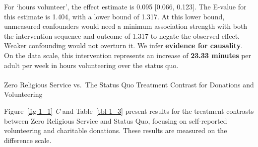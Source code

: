 \documentclass[
  single column]{article}
\makeatletter
\let\oldparagraph\paragraph
\renewcommand{\paragraph}{
    \@ifstar
      \xxxParagraphStar
      \xxxParagraphNoStar
  }
\newcommand{\xxxParagraphStar}[1]{\oldparagraph*{#1}\mbox{}}
\newcommand{\xxxParagraphNoStar}[1]{\oldparagraph{#1}\mbox{}}
\makeatother
\begin{document}
For `hours volunteer', the effect estimate is 0.095 {[}0.066, 0.123{]}.
The E-value for this estimate is 1.404, with a lower bound of 1.317. At
this lower bound, unmeasured confounders would need a minimum
association strength with both the intervention sequence and outcome of
1.317 to negate the observed effect. Weaker confounding would not
overturn it. We infer \textbf{evidence for causality}. On the data
scale, this intervention represents an increase of \textbf{23.33 minutes
} per adult per week in hours volunteering over the status quo.

\paragraph{Zero Religious Service vs.~The Status Quo Treatment Contrast
for Donations and
Volunteering}\label{zero-religious-service-vs.-the-status-quo-treatment-contrast-for-donations-and-volunteering}

Figure~\ref{fig-1_1} \emph{C} and Table~\ref{tbl-1_3} present results
for the treatment contrasts between Zero Religious Service and Status
Quo, focusing on self-reported volunteering and charitable donations.
These results are measured on the difference scale.
\end{document}
